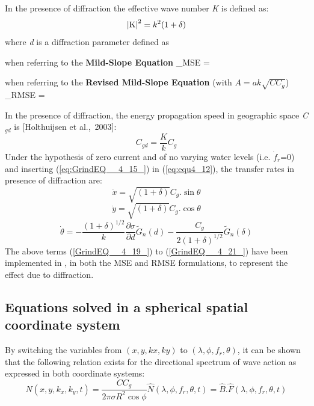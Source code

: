  In the presence of diffraction the effective wave number \textit{K} is defined as:
\begin{equation} \label{eq:GrindEQ__4_15_}
\left|{\rm K} \right|^{2} =k^{2} (1+\delta )
\end{equation}
where \textit{d} is a diffraction parameter defined as

when referring to the \textbf{Mild-Slope Equation} \cite{Berkhoff1972}
\bequ
\label{eq:GrindEQ__4_16_}
 \delta _{MSE} = 
\eequ       
     
when referring to the \textbf{Revised Mild-Slope Equation} \cite{Porter2003} (with $A=ak\sqrt{CC_{g}}$)
\bequ
\label{eq:GrindEQ__4_17_}
\delta _{RMSE} = 
\eequ

 In the presence of diffraction, the energy propagation speed in geographic space \textit{C${}_{gd}$} is [Holthuijsen et al.,~2003]:
\begin{equation} \label{GrindEQ__4_18_}
C_{gd} =\frac{K}{k} C_{g}
\end{equation}
Under the hypothesis of zero current and of no varying water levels (i.e. $\dot{f}_{r} $=0) and inserting (\ref{eq:GrindEQ__4_15_}) in (\ref{eq:equ4_12}), the transfer rates in presence of diffraction are:
\begin{equation} \label{GrindEQ__4_19_}
\dot{x}=\sqrt{(1+\delta )} C_{g} .\sin \theta
\end{equation}
\begin{equation} \label{GrindEQ__4_20_}
\dot{y}=\sqrt{(1+\delta )} C_{g} .\cos \theta
\end{equation}
\begin{equation} \label{GrindEQ__4_21_}
\dot{\theta }=-\frac{(1+\delta )^{1/2} }{k} \frac{\partial \sigma }{\partial d} \tilde{G}_{n} (d)-\frac{C_{g} }{2(1+\delta )^{1/2} } \tilde{G}_{n} (\delta )
\end{equation}
The above terms (\ref{GrindEQ__4_19_}) to (\ref{GrindEQ__4_21_}) have been implemented in \tomawac, in both the MSE and RMSE formulations, to represent the effect due to diffraction.


\subsection{ Equations solved in a spherical spatial coordinate system}

 By switching the variables from $(x, y, kx, ky)$ to $(\lambda, \phi, f_r, \theta)$, it can be shown that the following relation exists for the directional spectrum of wave action as expressed in both coordinate systems:
\begin{equation} \label{GrindEQ__4_22_}
N(x,y,k_{x} ,k_{y} ,t)=\frac{CC_{g} }{2\pi \sigma R^{2} \cos \phi } \hat{N}(\lambda ,\phi ,f_{r} ,\theta ,t)=\hat{B}.\hat{F}(\lambda ,\phi ,f_{r} ,\theta ,t)
\end{equation}


